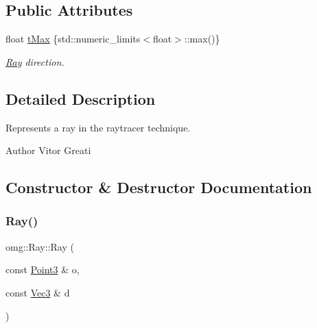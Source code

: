 \subsection*{Public Attributes}
\begin{DoxyCompactItemize}
\item 
\mbox{\label{classomg_1_1_ray_ab7848db0f649594f465d6b353786c552}} 
float \mbox{\hyperlink{classomg_1_1_ray_ab7848db0f649594f465d6b353786c552}{t\+Max}} \{std\+::numeric\+\_\+limits$<$float$>$\+::max()\}
\begin{DoxyCompactList}\small\item\em \mbox{\hyperlink{classomg_1_1_ray}{Ray}} direction. \end{DoxyCompactList}\end{DoxyCompactItemize}


\subsection{Detailed Description}
Represents a ray in the raytracer technique. 

\begin{DoxyAuthor}{Author}
Vitor Greati 
\end{DoxyAuthor}


\subsection{Constructor \& Destructor Documentation}
\mbox{\label{classomg_1_1_ray_a7418b3be2225de5510c63781ee5ad3f1}} 
\subsubsection{\texorpdfstring{Ray()}{Ray()}}
{\footnotesize\ttfamily omg\+::\+Ray\+::\+Ray (\begin{DoxyParamCaption}\item[{const \mbox{\hyperlink{namespaceomg_af85242d35fdacf829d32a6f9b95f3e35}{Point3}} \&}]{o,  }\item[{const \mbox{\hyperlink{namespaceomg_a45a9482677fee9933ff369b49894e316}{Vec3}} \&}]{d }\end{DoxyParamCaption})\hspace{0.3cm}{\ttfamily [inline]}}



